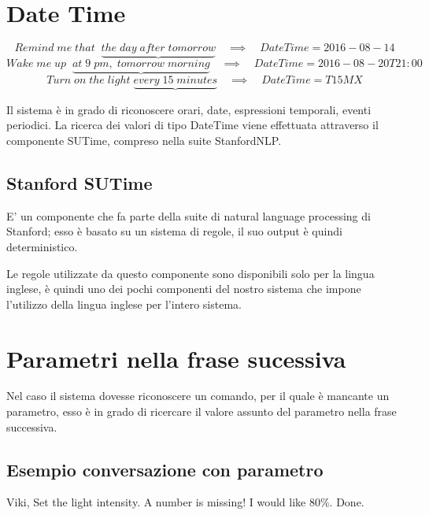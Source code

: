\documentclass[twoside]{supsistudent}
\begin{document}
\section{Date Time}
\begin{center}
\[
Remind\;me\;that\;\;
\underbrace{the\;day\;after\;tomorrow}
\quad\implies\quad DateTime = 2016-08-14
\]
\[
Wake\;me\;up\;\;
\underbrace{at\;9\;pm,\;tomorrow\;morning}
\quad\implies\quad DateTime = 2016-08-20T21:00
\]
\[
Turn\;on\;the\;light\;
\underbrace{every\;15\;minutes}
\quad\implies\quad DateTime = T15MX
\]
\end{center}
Il sistema è in grado di riconoscere orari, date, espressioni temporali, eventi periodici. La ricerca dei valori di tipo DateTime viene effettuata attraverso il componente SUTime, compreso nella suite StanfordNLP.\cite{stanfordSUTime}

\subsection{Stanford SUTime}
E' un componente che fa parte della suite di natural language processing di Stanford; esso è basato su un sistema di regole, il suo output è quindi deterministico.

Le regole utilizzate da questo componente sono disponibili solo per la lingua inglese, è quindi uno dei pochi componenti del nostro sistema che impone l'utilizzo della lingua inglese per l'intero sistema.

\newpage
\section{Parametri nella frase sucessiva}
Nel caso il sistema dovesse riconoscere un comando, per il quale è mancante un parametro, esso è in grado di ricercare il valore assunto del parametro nella frase successiva.
\subsection{Esempio conversazione con parametro}
\begin{dialogue}
 Viki, Set the light intensity.
 A number is missing!
 I would like 80\%.
 Done.
\end{dialogue}
\end{document}
